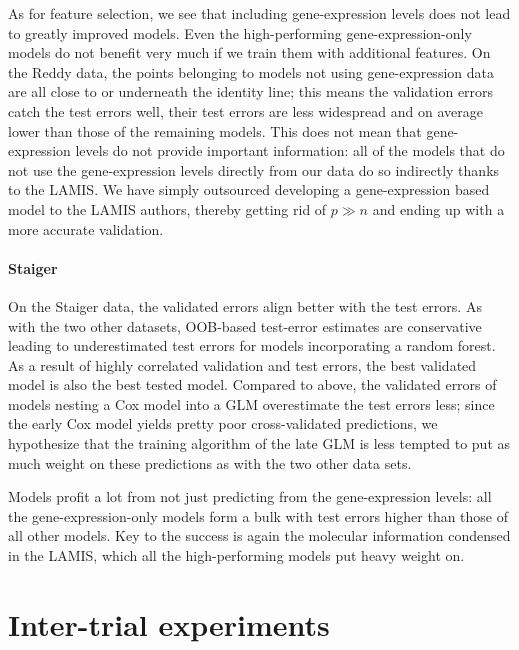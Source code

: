 As for feature selection, we see that including gene-expression levels does not lead to greatly 
improved models. Even the high-performing gene-expression-only models do not benefit very much if 
we train them with additional features. On the Reddy data, the points belonging to models not using 
gene-expression data are all close to or underneath the identity line; this means the validation 
errors 
catch the test errors well, their test errors are less widespread and on average lower than those 
of the remaining models. This does not mean that gene-expression levels do not provide important 
information: all of the models that do not use the gene-expression levels directly from our data 
do so indirectly thanks to the LAMIS. We have simply outsourced developing a gene-expression based 
model to the LAMIS authors, thereby getting rid of $p \gg n$ and ending up with a more accurate 
validation.

\paragraph{Staiger}

On the Staiger data, the validated errors align better with the test errors. As with the two other 
datasets, OOB-based test-error estimates are conservative leading to underestimated test errors 
for models incorporating a random forest. As a result of highly correlated validation and test 
errors, the best validated model is also the best tested model. Compared to above, the validated errors 
of models nesting a Cox model into a GLM overestimate the test errors less; since the early Cox 
model yields pretty poor cross-validated predictions, we hypothesize that the training 
algorithm of the late GLM is less tempted to put as much weight on these predictions as with the 
two other data sets.

Models profit a lot from not just predicting from the gene-expression levels: all the 
gene-expression-only models form a bulk with test errors higher than those of all other models. 
Key to the success is again the molecular information condensed in the LAMIS, which all the 
high-performing models put heavy weight on.

\section{Inter-trial experiments}\label{sec:inter-trial}

